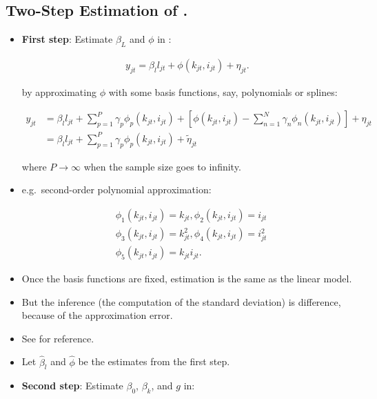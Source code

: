 \documentclass[]{book}
\providecommand{\tightlist}{%
  \setlength{\itemsep}{0pt}\setlength{\parskip}{0pt}}
\begin{document}
\subsection{\texorpdfstring{Two-Step Estimation of
\citet{Olley1996}.}{Two-Step Estimation of @Olley1996.}}\label{two-step-estimation-of-olley1996.}

\begin{itemize}
\tightlist
\item
  \textbf{First step}: Estimate \(\beta_L\) and \(\phi\) in :

  \begin{equation}
  \begin{split}
  y_{jt} = \beta_l l_{jt} + \phi(k_{jt}, i_{jt}) + \eta_{jt}.
  \end{split}
  \end{equation}

  by approximating \(\phi\) with some basis functions, say, polynomials
  or splines:

  \begin{equation}
  \begin{split}
  y_{jt} &= \beta_l l_{jt} +  \sum_{p = 1}^P \gamma_p \phi_p(k_{jt}, i_{jt}) +  \left[\phi(k_{jt}, i_{jt}) - \sum_{n = 1}^N \gamma_n \phi_n(k_{jt}, i_{jt})\right] + \eta_{jt}\\
  & = \beta_l l_{jt} +  \sum_{p = 1}^P \gamma_p \phi_p(k_{jt}, i_{jt}) + \tilde{\eta}_{jt}
  \end{split}
  \end{equation}

  where \(P \to \infty\) when the sample size goes to infinity.
\item
  e.g.~second-order polynomial approximation:

  \begin{equation}
  \begin{split}
  & \phi_1(k_{jt}, i_{jt}) = k_{jt}, \phi_2(k_{jt}, i_{jt}) = i_{jt}\\
  & \phi_3(k_{jt}, i_{jt}) = k_{jt}^2, \phi_4(k_{jt}, i_{jt}) = i_{jt}^2\\
  & \phi_5(k_{jt}, i_{jt}) = k_{jt} i_{jt}.
  \end{split}
  \end{equation}
\item
  Once the basis functions are fixed, estimation is the same as the
  linear model.
\item
  But the inference (the computation of the standard deviation) is
  difference, because of the approximation error.
\item
  See \citet{Chen2007} for reference.
\item
  Let \(\hat{\beta}_l\) and \(\hat{\phi}\) be the estimates from the
  first step.
\item
  \textbf{Second step}: Estimate \(\beta_0\), \(\beta_k\), and \(g\) in:


\end{itemize}
\end{document}

